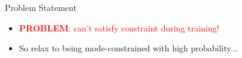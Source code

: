 \documentclass[final,11pt]{beamer}
\newlength{\colwidth}
\newcommand{\E}{\mathbb{E}}    %
\renewcommand{\mid}{\,|\,}
\DeclareMathOperator{\E}{\mathbb{E}}
\newcommand{\modeInd}{\ensuremath{k}}
\newcommand{\ModeInd}{\ensuremath{\MakeUppercase{\modeInd}}}
\newcommand{\mode}[1]{\ensuremath{#1_{\modeInd}}}
\newcommand{\state}{\ensuremath{\mathbf{x}}}
\newcommand{\control}{\ensuremath{\mathbf{u}}}
\newcommand{\modeVar}{\ensuremath{\alpha}}
\newcommand{\timeInd}{\ensuremath{t}}
\newcommand{\TimeInd}{\ensuremath{\MakeUppercase{\timeInd}}}
\newcommand{\dynamicsFunc}{\ensuremath{f}}
\newcommand{\desiredMode}{\ensuremath{\modeInd^{*}}}
\newcommand{\stateDomain}{\ensuremath{\mathcal{S}}}
\newcommand{\controlDomain}{\ensuremath{\mathcal{A}}}
\renewcommand{\state}{\ensuremath{\mathbf{s}}}
\renewcommand{\mode}[1]{\ensuremath{#1_{\modeInd}}}
\renewcommand{\control}{\ensuremath{\mathbf{a}}}
\newcommand{\rewardFunc}{\ensuremath{r}}
\begin{document}
\begin{frame}[t]
\begin{columns}[t]
\begin{column}{\colwidth}
\begin{block}{Problem Statement}
\begin{itemize}
      whilst remaining in the desired dynamic mode's $\desiredMode$ state domain $\stateDomain_{\desiredMode} = \{ \state \in \stateDomain \mid \modeVar(\state) = \desiredMode\}$:
        \begin{align} \label{eq-main-problem}
        \pi^{*}=\arg \max_{\pi \in \Pi} J(\pi, \dynamicsFunc) \quad \text{s.t. } &\color{black}{\underbrace{\modeVar(\state_{\timeInd}) = \desiredMode \quad \forall \timeInd \in \{0, \ldots, \TimeInd\}}_{\text{mode constraint}}},
        \end{align}
      \item \textcolor{red}{\textbf{PROBLEM}: can't satisfy constraint during training!}
      \item So relax to being mode-constrained with high probability...
    \end{itemize}




\end{block}
\end{column}
\end{columns}
\end{frame}
\end{document}

